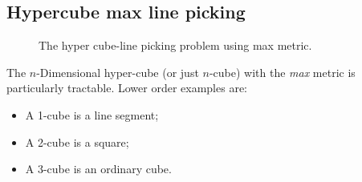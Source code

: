 \subsection{Hypercube max line picking}
\label{sec:hypercubemax_line}

\begin{figure}[tbp]
  \begin{center}
    \hspace{6mm}
    \caption{The hyper cube-line picking problem using max metric.}
  \end{center} 
\vspace{-4mm}
\end{figure}

The $n$-Dimensional hyper-cube (or just $n$-cube) with the {\em max} metric is particularly tractable.
Lower order examples are:
\begin{itemize}

\item A 1-cube is a line segment;

\item A 2-cube is a square;

\item A 3-cube is an ordinary cube.

\end{itemize}
 
